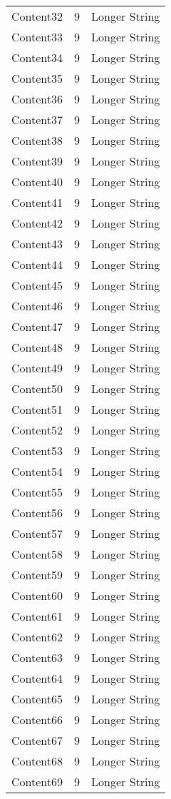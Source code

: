 \documentclass{article}%
\begin{document}
\begin{longtable}{l l l}
Content32&9&Longer String\\%
Content33&9&Longer String\\%
Content34&9&Longer String\\%
Content35&9&Longer String\\%
Content36&9&Longer String\\%
Content37&9&Longer String\\%
Content38&9&Longer String\\%
Content39&9&Longer String\\%
Content40&9&Longer String\\%
Content41&9&Longer String\\%
Content42&9&Longer String\\%
Content43&9&Longer String\\%
Content44&9&Longer String\\%
Content45&9&Longer String\\%
Content46&9&Longer String\\%
Content47&9&Longer String\\%
Content48&9&Longer String\\%
Content49&9&Longer String\\%
Content50&9&Longer String\\%
Content51&9&Longer String\\%
Content52&9&Longer String\\%
Content53&9&Longer String\\%
Content54&9&Longer String\\%
Content55&9&Longer String\\%
Content56&9&Longer String\\%
Content57&9&Longer String\\%
Content58&9&Longer String\\%
Content59&9&Longer String\\%
Content60&9&Longer String\\%
Content61&9&Longer String\\%
Content62&9&Longer String\\%
Content63&9&Longer String\\%
Content64&9&Longer String\\%
Content65&9&Longer String\\%
Content66&9&Longer String\\%
Content67&9&Longer String\\%
Content68&9&Longer String\\%
Content69&9&Longer String\\%

\end{longtable}
\end{document}

